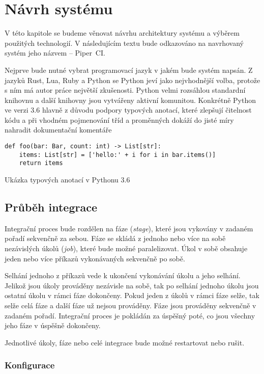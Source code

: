 \chapter{Návrh systému}

V této kapitole se budeme věnovat návrhu architektury systému a výběrem použitých technologií.
V následujícím textu bude odkazováno na navrhovaný systém jeho názvem -- Piper~CI.

Nejprve bude nutné vybrat programovací jazyk v jakém bude systém napsán.
Z jazyků Rust, Lua, Ruby a Python se Python jeví jako nejvhodnější volba, protože s ním má autor práce největší zkušenosti.
Python velmi rozsáhlou standardní knihovnu a další knihovny jsou vytvářeny aktivní komunitou.
Konkrétně Python ve verzi 3.6 hlavně z důvodu podpory typových anotací, které zlepšují čitelnost kódu a při vhodném pojmenování tříd a proměnných dokáží do jisté míry nahradit dokumentační komentáře

\begin{listing}[ht]
\begin{verbatim}
def foo(bar: Bar, count: int) -> List[str]:
    items: List[str] = ['hello:' + i for i in bar.items()]
    return items
\end{verbatim}
\caption{Ukázka typových anotací v Pythonu 3.6}
\end{listing}

\section{Průběh integrace}

Integrační proces bude rozdělen na fáze (\textit{stage}), které jsou vykovány v zadaném pořadí sekvenčně za sebou.
Fáze se skládá z jednoho nebo více na sobě nezávislých úkolů (\textit{job}), které bude možné paralelizovat. 
Úkol v sobě obsahuje jeden nebo více příkazů vykonávaných sekvenčně po sobě.

Selhání jednoho z příkazů vede k ukončení vykonávání úkolu a jeho selhání.
Jelikož jsou úkoly prováděny nezávisle na sobě, tak po selhání jednoho úkolu jsou ostatní úkolu v rámci fáze dokončeny.
Pokud jeden z úkolů v rámci fáze selže, tak selže celá fáze a další fáze už nejsou prováděny.
Fáze jsou prováděny sekvenčně v zadaném pořadí.
Integrační proces je pokládán za úspěšný poté, co jsou všechny jeho fáze v úspěšně dokončeny.

Jednotlivé úkoly, fáze nebo celé integrace bude možné restartovat nebo rušit.

\subsection{Konfigurace}


